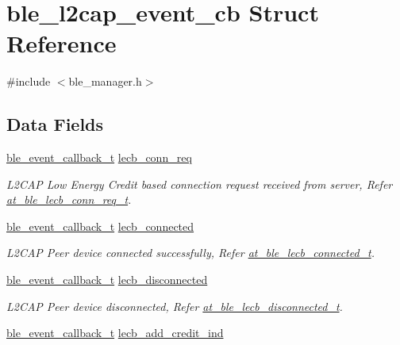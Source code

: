 \hypertarget{structble__l2cap__event__cb}{}\section{ble\+\_\+l2cap\+\_\+event\+\_\+cb Struct Reference}
\label{structble__l2cap__event__cb}


{\ttfamily \#include $<$ble\+\_\+manager.\+h$>$}

\subsection*{Data Fields}
\begin{DoxyCompactItemize}
\item 
\mbox{\hyperlink{ble__manager_8h_a04ce4bb8cb8282f2762e3924b1773cc9}{ble\+\_\+event\+\_\+callback\+\_\+t}} \mbox{\hyperlink{structble__l2cap__event__cb_a002fffb184fdde115a456e619b25bd9b}{lecb\+\_\+conn\+\_\+req}}
\begin{DoxyCompactList}\small\item\em L2\+C\+AP Low Energy Credit based connection request received from server, Refer \mbox{\hyperlink{structat__ble__lecb__conn__req__t}{at\+\_\+ble\+\_\+lecb\+\_\+conn\+\_\+req\+\_\+t}}. \end{DoxyCompactList}\item 
\mbox{\hyperlink{ble__manager_8h_a04ce4bb8cb8282f2762e3924b1773cc9}{ble\+\_\+event\+\_\+callback\+\_\+t}} \mbox{\hyperlink{structble__l2cap__event__cb_a0909a0ce0fb27144b5a7533754269102}{lecb\+\_\+connected}}
\begin{DoxyCompactList}\small\item\em L2\+C\+AP Peer device connected successfully, Refer \mbox{\hyperlink{structat__ble__lecb__connected__t}{at\+\_\+ble\+\_\+lecb\+\_\+connected\+\_\+t}}. \end{DoxyCompactList}\item 
\mbox{\hyperlink{ble__manager_8h_a04ce4bb8cb8282f2762e3924b1773cc9}{ble\+\_\+event\+\_\+callback\+\_\+t}} \mbox{\hyperlink{structble__l2cap__event__cb_a2bb3a4d79951fc2f85085cde5b2b8da0}{lecb\+\_\+disconnected}}
\begin{DoxyCompactList}\small\item\em L2\+C\+AP Peer device disconnected, Refer \mbox{\hyperlink{structat__ble__lecb__disconnected__t}{at\+\_\+ble\+\_\+lecb\+\_\+disconnected\+\_\+t}}. \end{DoxyCompactList}\item 
\mbox{\hyperlink{ble__manager_8h_a04ce4bb8cb8282f2762e3924b1773cc9}{ble\+\_\+event\+\_\+callback\+\_\+t}} \mbox{\hyperlink{structble__l2cap__event__cb_a9c143adfcb634b9c39eff72d41b39ffb}{lecb\+\_\+add\+\_\+credit\+\_\+ind}}

\end{DoxyCompactItemize}
